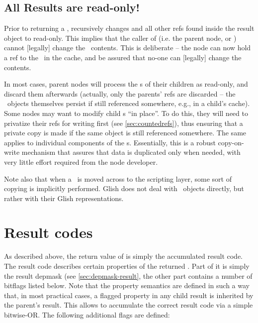 \subsection{All Results are read-only!}

  Prior to returning a \Result,  recursively changes 
  and all other refs found inside the result object to read-only. This implies
  that the caller of  (i.e. the parent node, or )
  cannot [legally] change the \Result\ contents. This is deliberate -- the node
  can now hold a ref to the \Result\ in the cache, and be assured that no-one
  can [legally] change the contents. 
  
  In most cases, parent nodes will process the \Result{}s of their children as
  read-only, and discard them afterwards (actually, only the parents' refs are
  discarded -- the \Result\ objects themselves persist if still referenced
  somewhere, e.g., in a child's cache). Some nodes may want to modify child
  \Result{}s ``in place''. To do this, they will need to privatize their refs
  for writing first (see \ref{sec:countedrefs}), thus ensuring that a private
  copy is made if the same object is still referenced somewhere. The same
  applies to individual components of the \Result{}s. Essentially, this is a
  robust copy-on-write mechanism that assures that data is duplicated only when
  needed, with very little effort required from the node developer.
  
  Note also that when a \Result\ is moved across to the scripting layer, some
  sort of copying is implicitly performed. Glish does not deal with \Result\
  objects directly, but rather with their Glish representations.

\section{Result codes}

  As described above, the return value of  is simply the
  accumulated result code. The result code describes certain properties of the
  returned \Result. Part of it is simply the result depmask (see
  \ref{sec:depmask-result}, the other part contains a number of bitflags listed
  below. Note that the property semantics are defined in such a way that, in
  most practical cases, a flagged property in any child result is inherited by
  the parent's result. This allows \qq{execute()} to accumulate the correct
  result code via a simple bitwise-OR. The following additional flags are
  defined:
 

